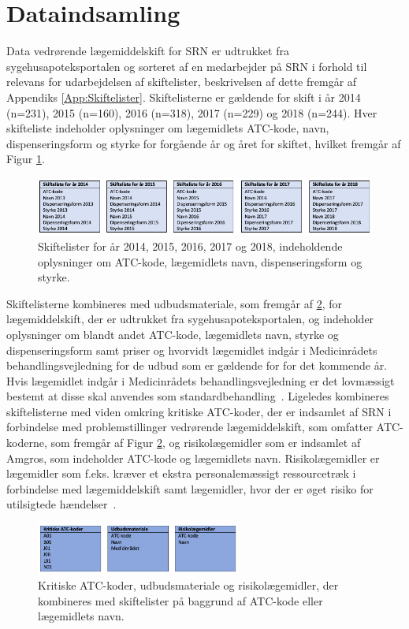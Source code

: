 \section{Dataindsamling}
Data vedrørende lægemiddelskift for SRN er udtrukket fra sygehusapoteksportalen og sorteret af en medarbejder på SRN i forhold til relevans for udarbejdelsen af skiftelister, beskrivelsen af dette fremgår af Appendiks \ref{App:Skiftelister}. Skiftelisterne er gældende for skift i år 2014 (n=231), 2015 (n=160), 2016 (n=318), 2017 (n=229) og 2018 (n=244). Hver skifteliste indeholder oplysninger om lægemidlets ATC-kode, navn, dispenseringsform og styrke for forgående år og året for skiftet, hvilket fremgår af Figur \ref{fig:Input}.

\begin{figure}[H]\centering
\includegraphics[width=1\textwidth]{billeder/Input1.png} 
	\caption{Skiftelister for år 2014, 2015, 2016, 2017 og 2018, indeholdende oplysninger om ATC-kode, lægemidlets navn, dispenseringsform og styrke.}
	\label{fig:Input}  
\end{figure}

Skiftelisterne kombineres med udbudsmateriale, som fremgår af \ref{fig:Input2}, for lægemiddelskift, der er udtrukket fra sygehusapoteksportalen, og indeholder oplysninger om blandt andet ATC-kode, lægemidlets navn, styrke og dispenseringsform samt priser og hvorvidt lægemidlet indgår i Medicinrådets behandlingsvejledning for de udbud som er gældende for for det kommende år. Hvis lægemidlet indgår i Medicinrådets behandlingsvejledning er det lovmæssigt bestemt at disse skal anvendes som standardbehandling~\citep{Medicinradet2018}. Ligeledes kombineres skiftelisterne med viden omkring kritiske ATC-koder, der er indsamlet af SRN i forbindelse med problemstillinger vedrørende lægemiddelskift, som omfatter ATC-koderne, som fremgår af Figur \ref{fig:Input2}, og risikolægemidler som er indsamlet af Amgros, som indeholder ATC-kode og lægemidlets navn. Risikolægemidler er lægemidler som f.eks. kræver et ekstra personalemæssigt ressourcetræk i forbindelse med lægemiddelskift samt lægemidler, hvor der er øget risiko for utilsigtede hændelser~\citep{Amgros}. 

\begin{figure}[H]\centering
\includegraphics[width=0.6\textwidth]{billeder/Input2.png} 
	\caption{Kritiske ATC-koder, udbudsmateriale og risikolægemidler, der kombineres med skiftelister på baggrund af ATC-kode eller lægemidlets navn.}
	\label{fig:Input2}  
\end{figure}

